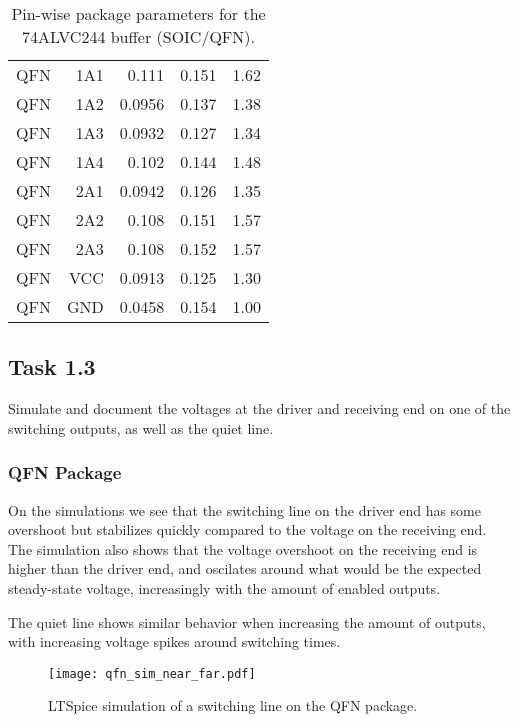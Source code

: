 \documentclass[../main.tex]{subfiles}
\begin{document}
\begin{table}[h]
\begin{tabular}{r|r r r r}
        QFN  & 1A1  & 0.111  & 0.151 & 1.62 \\
        QFN  & 1A2  & 0.0956 & 0.137 & 1.38 \\
        QFN  & 1A3  & 0.0932 & 0.127 & 1.34 \\
        QFN  & 1A4  & 0.102  & 0.144 & 1.48 \\
        QFN  & 2A1  & 0.0942 & 0.126 & 1.35 \\
        QFN  & 2A2  & 0.108  & 0.151 & 1.57 \\
        QFN  & 2A3  & 0.108  & 0.152 & 1.57 \\
        \midrule
        QFN  & VCC  & 0.0913 & 0.125 & 1.30 \\
        QFN  & GND  & 0.0458 & 0.154 & 1.00 \\
        \bottomrule[1pt]
    \end{tabular}
    \caption{Pin-wise package parameters for the 74ALVC244 buffer (SOIC/QFN).}
    \label{tab:pkg-params}
\end{table}

\newpage

\subsection{Task 1.3}

Simulate and document the voltages at the driver and receiving end on one of the switching outputs, as well as the quiet line.

\subsubsection{QFN Package}

On the simulations we see that the switching line on the driver end has some overshoot but stabilizes quickly compared to the voltage on the receiving end. 
The simulation also shows that the voltage overshoot on the receiving end is higher than the driver end, and oscilates around what would be the expected 
steady-state voltage, increasingly with the amount of enabled outputs. 

The quiet line shows similar behavior when increasing the amount of outputs, with increasing voltage spikes around switching times.
\begin{figure}[h]
    \centering
    \texttt{[image: qfn\_sim\_near\_far.pdf]}
    \caption{LTSpice simulation of a switching line on the QFN package.}
    \label{fig:qfn_sim_near_far}
\end{figure}
\end{document}
